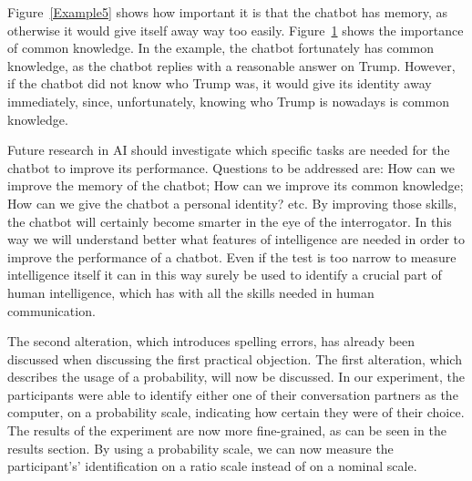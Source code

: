 Figure~\ref{Example5} shows how important it is that the chatbot has memory, as otherwise it would give itself away way too easily. Figure~\ref{Example6} shows the importance of common knowledge. In the example, the chatbot fortunately has common knowledge, as the chatbot replies with a reasonable answer on Trump. However, if the chatbot did not know who Trump was, it would give its identity away immediately, since, unfortunately, knowing who Trump is nowadays is common knowledge.

Future research in AI should investigate which specific tasks are needed for the chatbot to improve its performance. Questions to be addressed are: How can we improve the memory of the chatbot; How can we improve its common knowledge; How can we give the chatbot a personal identity? etc. By improving those skills, the chatbot will certainly become smarter in the eye of the interrogator. In this way we will understand better what features of intelligence are needed in order to improve the performance of a chatbot. Even if the test is too narrow to measure intelligence itself it can in this way surely be used to identify a crucial part of human intelligence, which has with all the skills needed in human communication.

\begin{figure}[ht]
   \begin{center}
   \end{center}
   \label{Example6}
\end{figure}

The second alteration, which introduces spelling errors, has already been discussed when discussing the first practical objection. The first alteration, which describes the usage of a probability, will now be discussed. In our experiment, the participants were able to identify either one of their conversation partners as the computer, on a probability scale, indicating how certain they were of their choice. The results of the experiment are now more fine-grained, as can be seen in the results section. By using a probability scale, we can now measure the participant's' identification on a ratio scale instead of on a nominal scale.

